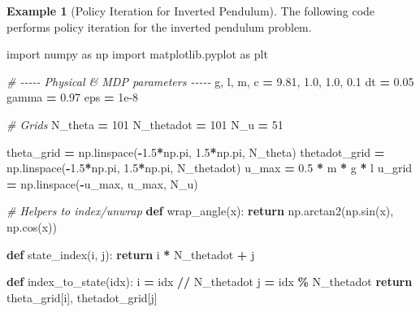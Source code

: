 \documentclass[
]{book}
\newenvironment{Shaded}{\begin{snugshade}}{\end{snugshade}}
\newcommand{\CommentTok}[1]{\textcolor[rgb]{0.56,0.35,0.01}{\textit{#1}}}
\newcommand{\ControlFlowTok}[1]{\textcolor[rgb]{0.13,0.29,0.53}{\textbf{#1}}}
\newcommand{\DecValTok}[1]{\textcolor[rgb]{0.00,0.00,0.81}{#1}}
\newcommand{\FloatTok}[1]{\textcolor[rgb]{0.00,0.00,0.81}{#1}}
\newcommand{\ImportTok}[1]{#1}
\newcommand{\KeywordTok}[1]{\textcolor[rgb]{0.13,0.29,0.53}{\textbf{#1}}}
\newcommand{\NormalTok}[1]{#1}
\newcommand{\OperatorTok}[1]{\textcolor[rgb]{0.81,0.36,0.00}{\textbf{#1}}}
\theoremstyle{definition}
\theoremstyle{definition}
\newtheorem{example}{Example}[chapter]
\theoremstyle{definition}
\theoremstyle{definition}
\theoremstyle{remark}
\begin{document}
\begin{example}[Policy Iteration for Inverted Pendulum]
\protect\hypertarget{exm:InvertedPendulumPolicyIteration}{}\label{exm:InvertedPendulumPolicyIteration}The following code performs policy iteration for the inverted pendulum problem.

\begin{Shaded}
\begin{Highlighting}[]
\ImportTok{import}\NormalTok{ numpy }\ImportTok{as}\NormalTok{ np}
\ImportTok{import}\NormalTok{ matplotlib.pyplot }\ImportTok{as}\NormalTok{ plt}

\CommentTok{\# {-}{-}{-}{-}{-} Physical \& MDP parameters {-}{-}{-}{-}{-}}
\NormalTok{g, l, m, c }\OperatorTok{=} \FloatTok{9.81}\NormalTok{, }\FloatTok{1.0}\NormalTok{, }\FloatTok{1.0}\NormalTok{, }\FloatTok{0.1}
\NormalTok{dt }\OperatorTok{=} \FloatTok{0.05}
\NormalTok{gamma }\OperatorTok{=} \FloatTok{0.97}
\NormalTok{eps }\OperatorTok{=} \FloatTok{1e{-}8}

\CommentTok{\# Grids}
\NormalTok{N\_theta }\OperatorTok{=} \DecValTok{101}
\NormalTok{N\_thetadot }\OperatorTok{=} \DecValTok{101}
\NormalTok{N\_u }\OperatorTok{=} \DecValTok{51}

\NormalTok{theta\_grid }\OperatorTok{=}\NormalTok{ np.linspace(}\OperatorTok{{-}}\FloatTok{1.5}\OperatorTok{*}\NormalTok{np.pi, }\FloatTok{1.5}\OperatorTok{*}\NormalTok{np.pi, N\_theta)}
\NormalTok{thetadot\_grid }\OperatorTok{=}\NormalTok{ np.linspace(}\OperatorTok{{-}}\FloatTok{1.5}\OperatorTok{*}\NormalTok{np.pi, }\FloatTok{1.5}\OperatorTok{*}\NormalTok{np.pi, N\_thetadot)}
\NormalTok{u\_max }\OperatorTok{=} \FloatTok{0.5} \OperatorTok{*}\NormalTok{ m }\OperatorTok{*}\NormalTok{ g }\OperatorTok{*}\NormalTok{ l}
\NormalTok{u\_grid }\OperatorTok{=}\NormalTok{ np.linspace(}\OperatorTok{{-}}\NormalTok{u\_max, u\_max, N\_u)}

\CommentTok{\# Helpers to index/unwrap}
\KeywordTok{def}\NormalTok{ wrap\_angle(x):}
    \ControlFlowTok{return}\NormalTok{ np.arctan2(np.sin(x), np.cos(x))}

\KeywordTok{def}\NormalTok{ state\_index(i, j):}
    \ControlFlowTok{return}\NormalTok{ i }\OperatorTok{*}\NormalTok{ N\_thetadot }\OperatorTok{+}\NormalTok{ j}

\KeywordTok{def}\NormalTok{ index\_to\_state(idx):}
\NormalTok{    i }\OperatorTok{=}\NormalTok{ idx }\OperatorTok{//}\NormalTok{ N\_thetadot}
\NormalTok{    j }\OperatorTok{=}\NormalTok{ idx }\OperatorTok{\%}\NormalTok{ N\_thetadot}
    \ControlFlowTok{return}\NormalTok{ theta\_grid[i], thetadot\_grid[j]}


\end{Highlighting}
\end{Shaded}
\end{example}
\end{document}
